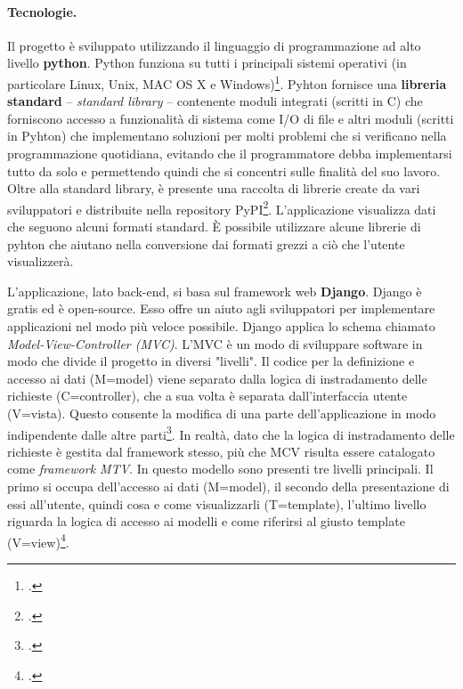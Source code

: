 \documentclass[./main.tex]{subfiles}
\begin{document}
\paragraph{Tecnologie.}
Il progetto è sviluppato utilizzando il linguaggio di programmazione ad alto livello \textbf{python}. Python funziona su tutti i principali sistemi operativi (in particolare Linux, Unix, MAC OS X e Windows)\footcite[\url{https://wiki.python.org/moin/BeginnersGuide/Overview}]{website-wiki-python}. Pyhton fornisce una \textbf{libreria standard} -- \textit{standard library } -- contenente moduli integrati (scritti in C) che forniscono accesso a funzionalità di sistema come I/O di file e altri moduli (scritti in Pyhton) che implementano soluzioni per molti problemi che si verificano nella programmazione quotidiana, evitando che il programmatore debba implementarsi tutto da solo e permettendo quindi che si concentri sulle finalità del suo lavoro. Oltre alla standard library, è presente una raccolta di librerie create da vari sviluppatori e distribuite nella repository PyPI\footcite[\url{https://pypi.org/}]{website-pypi}. L'applicazione visualizza dati che seguono alcuni formati standard. È possibile utilizzare alcune librerie di pyhton che aiutano nella conversione dai formati grezzi a ciò che l'utente visualizzerà.\par

L'applicazione, lato back-end, si basa sul framework web \textbf{Django}. Django è gratis ed è open-source. Esso offre un aiuto agli sviluppatori per implementare applicazioni nel modo più veloce possibile. Django applica lo schema chiamato \textit{Model-View-Controller (MVC)}. L'MVC è un modo di sviluppare software in modo che divide il progetto in diversi "livelli". Il codice per la definizione e accesso ai dati (M=model) viene separato dalla logica di instradamento delle richieste (C=controller), che a sua volta è separata dall'interfaccia utente (V=vista). Questo consente la modifica di una parte dell'applicazione in modo indipendente dalle altre parti\footcite[5-10]{the-django-book}. In realtà, dato che la logica di instradamento delle richieste è gestita dal framework stesso, più che MCV risulta essere catalogato come \textit{framework MTV}. In questo modello sono presenti tre livelli principali. Il primo si occupa dell'accesso ai dati (M=model), il secondo della presentazione di essi all'utente, quindi cosa e come visualizzarli (T=template), l'ultimo livello riguarda la logica di accesso ai modelli e come riferirsi al giusto template (V=view)\footcite[62-63]{the-django-book}.\par
\end{document}
